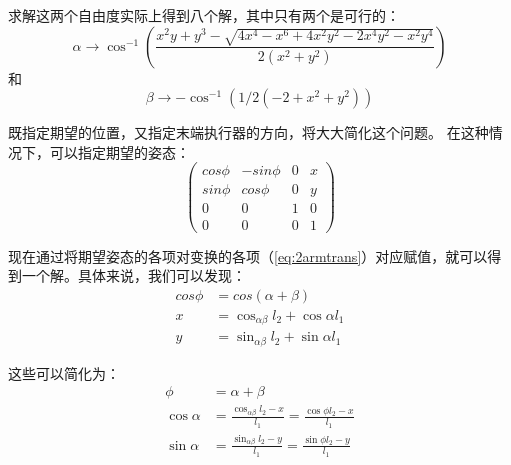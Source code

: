 
求解这两个自由度实际上得到八个解，其中只有两个是可行的：
\begin{equation}
\alpha \rightarrow \cos^{-1}\left(\frac{x^2 y + y^3 - \sqrt{4 x^4 - x^6 + 4 x^2 y^2 - 2 x^4 y^2 - x^2 y^4}}{2 (x^2 + y^2)}\right)
\end{equation}
和
\begin{equation}
\beta \rightarrow -\cos^{-1}\left(1/2(-2+x^2+y^2)\right)
\end{equation}


既指定期望的位置，又指定末端执行器的方向，将大大简化这个问题。 在这种情况下，可以指定期望的姿态：
\begin{equation}
\left(
\begin{array}{cccc}
cos\phi & -sin\phi & 0 & x\\
sin\phi & cos\phi & 0 & y\\
0 & 0 & 1 & 0\\
0 & 0 & 0 & 1
\end{array}
\right)
\end{equation}


现在通过将期望姿态的各项对变换的各项（\ref{eq:2armtrans}）对应赋值，就可以得到一个解。具体来说，我们可以发现：
\begin{eqnarray}
cos\phi &= cos(\alpha+\beta)\\
\nonumber
x &= \cos_{\alpha\beta}l_2+\cos\alpha l_1\\
\nonumber
y &= \sin_{\alpha\beta}l_2+\sin\alpha l_1
\end{eqnarray}

这些可以简化为：
\begin{eqnarray}
\phi &= \alpha + \beta\\
\nonumber
\cos\alpha &= \frac{\cos_{\alpha\beta}l_2-x}{l_1}=\frac{\cos\phi l_2-x}{l_1}\\
\nonumber
\sin\alpha &= \frac{\sin_{\alpha\beta}l_2-y}{l_1}=\frac{\sin\phi l_2-y}{l_1}\\
\end{eqnarray}


